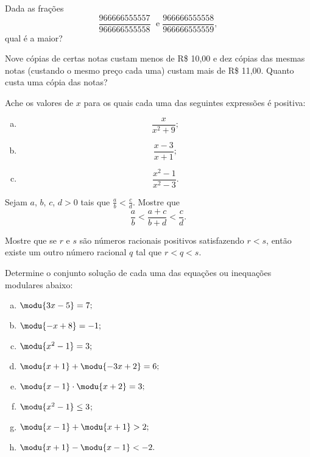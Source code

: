 \begin{exercise}
Dada as frações $$\frac{966666555557}{966666555558} \; \text{ e
} \; \frac{966666555558}{966666555559},$$ qual é a maior?
\end{exercise}


\begin{exercise}
Nove cópias de certas notas custam menos de R\$ 10,00 e dez
cópias das mesmas notas (custando o mesmo preço cada uma) custam
mais de R\$ 11,00. Quanto custa uma cópia das notas? 
\end{exercise}

\begin{exercise}
Ache os valores de $x$ para os quais cada uma das seguintes
expressões é positiva:
\begin{enumerate}[a.]
  \item $$\frac x {x^2+9};$$
  \item $$\frac{x-3}{x+1};$$
  \item $$\frac{x^2-1}{x^2-3}.$$
\end{enumerate}
\end{exercise}

\begin{exercise}
Sejam  $a$, $b$, $c$, $d > 0$ tais que $\frac a b < \frac c d$.
Mostre que $$\frac a b < \frac {a+c} {b+d} < \frac c d.$$
\end{exercise}

\begin{exercise}
  Mostre que se $r$ e $s$ são números racionais positivos satisfazendo $r < s$,
  então existe um outro número racional $q$ tal que $r<q<s$.
\end{exercise}

\begin{exercise}
Determine o conjunto solução de cada uma das equações ou
inequações modulares abaixo:
\begin{enumerate}[a.]
  \item $\modu {3x - 5}= 7;$
  \item $\modu {-x +8} = -1;$
  \item $\modu{x^2 - 1}= 3;$
  \item $\modu{x +1} + \modu { -3x +2} = 6;$
  \item $\modu{x-1} \cdot \modu{x+2} = 3;$
  \item $\modu{x^2-1}\le 3$;
  \item $\modu{x-1}+ \modu{x+1}>2;$
  \item $\modu{x+1}- \modu{x-1}<-2.$
\end{enumerate}
\end{exercise}

